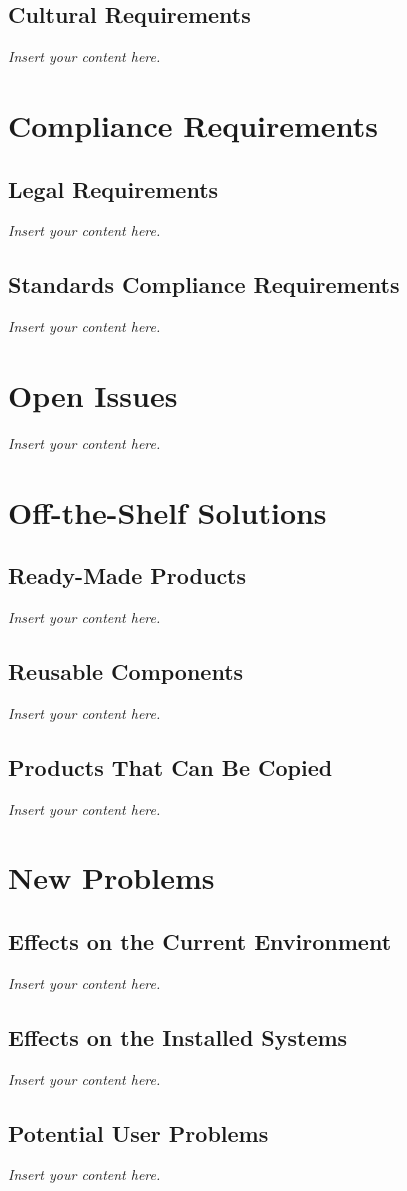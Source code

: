 \documentclass[12pt]{article}
\newcommand{\lips}{\textit{Insert your content here.}}
\begin{document}
\subsection{Cultural Requirements}
\lips

\section{Compliance Requirements}
\subsection{Legal Requirements}
\lips
\subsection{Standards Compliance Requirements}
\lips

\section{Open Issues}
\lips

\section{Off-the-Shelf Solutions}
\subsection{Ready-Made Products}
\lips
\subsection{Reusable Components}
\lips
\subsection{Products That Can Be Copied}
\lips

\section{New Problems}
\subsection{Effects on the Current Environment}
\lips
\subsection{Effects on the Installed Systems}
\lips
\subsection{Potential User Problems}
\lips
\end{document}
